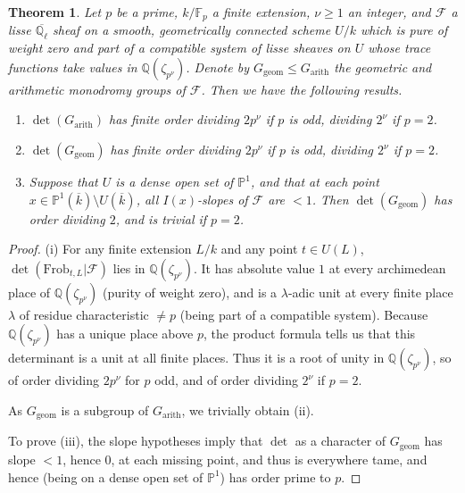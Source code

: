 \documentclass[11pt]{amsart}
\theoremstyle{plain}
\newtheorem{thm}{Theorem}
\theoremstyle{definition}
\numberwithin{thm}{section}
\numberwithin{equation}{thm}
\newcommand{\sF}{{\mathcal F}}
\newcommand{\F}{{\mathbb F}}
\renewcommand{\P}{{\mathbb P}}
\newcommand{\Q}{{\mathbb Q}}
\newcommand{\0}{\emptyset}
\newcommand{\ari}{{\mathrm {arith}}}
\newcommand{\geo}{{\mathrm {geom}}}
\newcommand{\Frob}{\mathrm{Frob}}
\begin{document}
\begin{thm}\label{dets}Let $p$ be a prime, $k/\F_p$ a finite extension, $\nu \ge 1$ an integer, and $\sF$ a lisse $\overline{\Q_\ell}$ sheaf on a smooth, geometrically connected scheme $U/k$ which is pure of weight zero and part of a compatible system of lisse sheaves on $U$ whose trace functions take values in
$\Q(\zeta_{p^\nu})$. Denote by $G_{\geo}\leq G_{\ari}$ the geometric and arithmetic monodromy groups of $\sF$. Then we have the following results.
\begin{enumerate}[\rm(i)]
\item $\det(G_{\ari})$ has finite order dividing $2p^\nu$ if $p$ is odd, dividing $2^\nu$ if $p=2$.
\item $\det(G_{\geo})$ has finite order dividing $2p^\nu$ if $p$ is odd, dividing $2^\nu$ if $p=2$.
\item Suppose that $U$ is a dense open set of $\P^1$, and that at each point $x \in \P^1(\overline{k})\setminus U(\overline{k})$, all $I(x)$-slopes of $\sF$ are $<1$. Then $\det(G_{\geo})$ has order dividing $2$, and is trivial if $p=2$.
\end{enumerate}
\end{thm}

\begin{proof}
(i) For any finite extension $L/k$ and any point $t \in U(L)$, $\det(\Frob_{t,L}|\sF)$ lies in $\Q(\zeta_{p^\nu})$. It has absolute value $1$ at every archimedean place of $\Q(\zeta_{p^\nu})$ (purity of weight zero), and is a $\lambda$-adic unit at every finite place $\lambda$ of residue characteristic $\neq p$ (being part of a compatible system).  Because $\Q(\zeta_{p^\nu})$ has a unique place above $p$, the product formula tells us that this determinant is a unit
at all finite places. Thus it is a root of unity in $\Q(\zeta_{p^\nu})$, so of order dividing $2p^\nu$ for $p$ odd, and of order dividing $2^\nu$ if $p=2$.

As $G_{\geo}$ is a subgroup of $G_{\ari}$, we trivially obtain (ii). 

To prove (iii), the slope hypotheses imply that $\det$ as a character of $G_{\geo}$ has slope $<1$, hence $0$, at each missing point, and thus is everywhere tame, and hence (being on a dense open set of $\P^1$) has order prime to $p$.
\end{proof}
\end{document}
